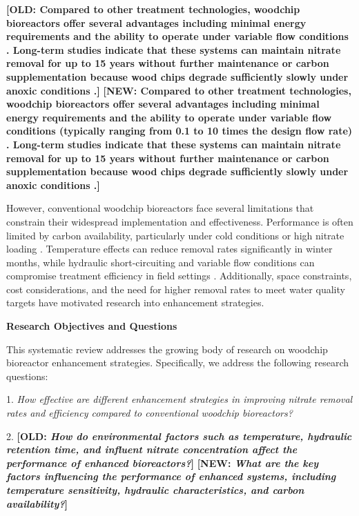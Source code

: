 \documentclass[12pt,a4paper]{article}
\newcommand{\changed}[2]{\textcolor{deletedtext}{\textbf{[OLD: #1]}} \textcolor{changedtext}{\textbf{[NEW: #2]}}}
\begin{document}
\changed{Compared to other treatment technologies, woodchip bioreactors offer several advantages including minimal energy requirements and the ability to operate under variable flow conditions \citep{RN625, RN310}. Long-term studies indicate that these systems can maintain nitrate removal for up to 15 years without further maintenance or carbon supplementation because wood chips degrade sufficiently slowly under anoxic conditions \citep{RN625, RN629}.}{Compared to other treatment technologies, woodchip bioreactors offer several advantages including minimal energy requirements and the ability to operate under variable flow conditions (typically ranging from 0.1 to 10 times the design flow rate) \citep{RN625, RN310}. Long-term studies indicate that these systems can maintain nitrate removal for up to 15 years without further maintenance or carbon supplementation because wood chips degrade sufficiently slowly under anoxic conditions \citep{RN625, RN629}.}

However, conventional woodchip bioreactors face several limitations that constrain their widespread implementation and effectiveness. Performance is often limited by carbon availability, particularly under cold conditions or high nitrate loading \citep{RN625, RN228, RN258}. Temperature effects can reduce removal rates significantly in winter months, while hydraulic short-circuiting and variable flow conditions can compromise treatment efficiency in field settings \citep{RN228, RN309}. Additionally, space constraints, cost considerations, and the need for higher removal rates to meet water quality targets have motivated research into enhancement strategies.

\textbf{Research Objectives and Questions}

This systematic review addresses the growing body of research on woodchip bioreactor enhancement strategies. Specifically, we address the following research questions:

1. \textit{How effective are different enhancement strategies in improving nitrate removal rates and efficiency compared to conventional woodchip bioreactors?}

2. \changed{\textit{How do environmental factors such as temperature, hydraulic retention time, and influent nitrate concentration affect the performance of enhanced bioreactors?}}{\textit{What are the key factors influencing the performance of enhanced systems, including temperature sensitivity, hydraulic characteristics, and carbon availability?}}
\end{document}
